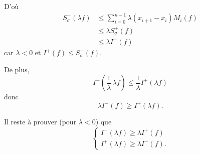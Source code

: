 \begin{prv}
\begin{itemize}
			D'où
			\begin{align*}
				S^-_{\sigma}(\lambda f) &\le \sum_{i=0}^{n-1}\lambda (x_{i+1}-x_i) M_i(f)\\
				&\le \lambda S^+_\sigma(f)\\
				&\le \lambda I^+(f)
			\end{align*}
			car $\lambda < 0$ et $I^+(f) \le S_\sigma^+(f)$.

			De plus, \[
				I^-\left( \frac{1}{\lambda}\,\lambda f \right) \le \frac{1}{\lambda} I^+(\lambda f)
			\] donc \[
				\lambda I^-(f) \ge I^+(\lambda f)
			.\]
			\vspace{1cm}

			Il reste à prouver (pour $\lambda < 0$) que \[
				\begin{cases}
					I^-(\lambda f) \ge \lambda I^+(f)\\
					I^+(\lambda f) \ge \lambda I^-(f).
				\end{cases}
			\]
	\end{itemize}
\end{prv}

